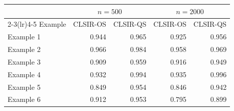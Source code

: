 \begin{tabular}{lrrrr}
\toprule
& \multicolumn{2}{c}{$n=500$} & \multicolumn{2}{c}{$n=2000$}\\
\cmidrule(lr){2-3}\cmidrule(lr){4-5}
Example & CLSIR-OS & CLSIR-QS & CLSIR-OS & CLSIR-QS\\
\midrule
Example 1 & 0.944 & 0.965 & 0.925 & 0.956\\
Example 2 & 0.966 & 0.984 & 0.958 & 0.969\\
Example 3 & 0.909 & 0.959 & 0.916 & 0.949\\
Example 4 & 0.932 & 0.994 & 0.935 & 0.996\\
Example 5 & 0.849 & 0.954 & 0.846 & 0.942\\
Example 6 & 0.912 & 0.953 & 0.795 & 0.899\\
\bottomrule
\end{tabular}
